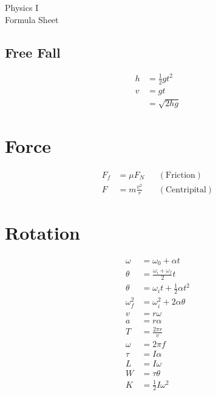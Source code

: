 \documentclass[10pt]{article}
\begin{document}
\begin{multicols*}{4}

\begin{center}
    \Large
    Physics \textrm{I} \\
    Formula Sheet
\end{center}

\subsection{Free Fall}

\begin{align*}
    h &= \frac{1}{2}gt^2\\
    v &= gt\\
      &= \sqrt{2hg}
\end{align*}

\section{Force}

\begin{align*}
    F_f &= \mu F_N && (\text{Friction})\\
    F &= m \frac{v^2}{r} && (\text{Centripital})
\end{align*}

\section{Rotation}

\begin{align*}
    \omega     &= \omega_0 + \alpha t\\
    \theta     &= \frac{\omega_i + \omega_f}{2} t\\
    \theta     &= \omega_it + \tfrac{1}{2}\alpha t^2\\
    \omega_f^2 &= \omega_i^2 + 2 \alpha \theta\\
    v          &= r\omega\\
    a          &= r\alpha\\
    T          &= \frac{2\pi r}{v}\\
    \omega     &= 2\pi f\\
    \tau       &= I\alpha\\
    L          &= I\omega\\
    W          &= \tau \theta\\
    K          &= \tfrac{1}{2}I\omega^2
\end{align*}


\end{multicols*}
\end{document}
